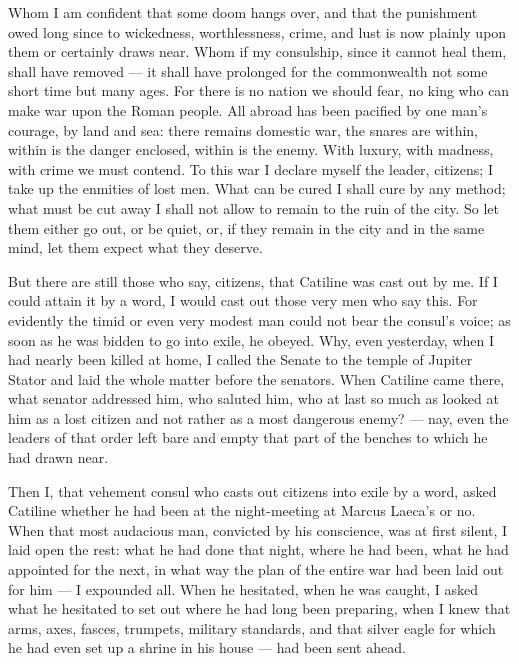  Whom I am confident that some doom hangs over, and that the punishment owed long since to wickedness, worthlessness, crime, and lust is now plainly upon them or certainly draws near. Whom if my consulship, since it cannot heal them, shall have removed --- it shall have prolonged for the commonwealth not some short time but many ages. For there is no nation we should fear, no king who can make war upon the Roman people. All abroad has been pacified by one man's courage, by land and sea: there remains domestic war, the snares are within, within is the danger enclosed, within is the enemy. With luxury, with madness, with crime we must contend. To this war I declare myself the leader, citizens; I take up the enmities of lost men. What can be cured I shall cure by any method; what must be cut away I shall not allow to remain to the ruin of the city. So let them either go out, or be quiet, or, if they remain in the city and in the same mind, let them expect what they deserve.

 But there are still those who say, citizens, that Catiline was cast out by me. If I could attain it by a word, I would cast out those very men who say this. For evidently the timid or even very modest man could not bear the consul's voice; as soon as he was bidden to go into exile, he obeyed. Why, even yesterday, when I had nearly been killed at home, I called the Senate to the temple of Jupiter Stator and laid the whole matter before the senators. When Catiline came there, what senator addressed him, who saluted him, who at last so much as looked at him as a lost citizen and not rather as a most dangerous enemy? --- nay, even the leaders of that order left bare and empty that part of the benches to which he had drawn near.

 Then I, that vehement consul who casts out citizens into exile by a word, asked Catiline whether he had been at the night-meeting at Marcus Laeca's or no. When that most audacious man, convicted by his conscience, was at first silent, I laid open the rest: what he had done that night, where he had been, what he had appointed for the next, in what way the plan of the entire war had been laid out for him --- I expounded all. When he hesitated, when he was caught, I asked what he hesitated to set out where he had long been preparing, when I knew that arms, axes, fasces, trumpets, military standards, and that silver eagle for which he had even set up a shrine in his house --- had been sent ahead.

